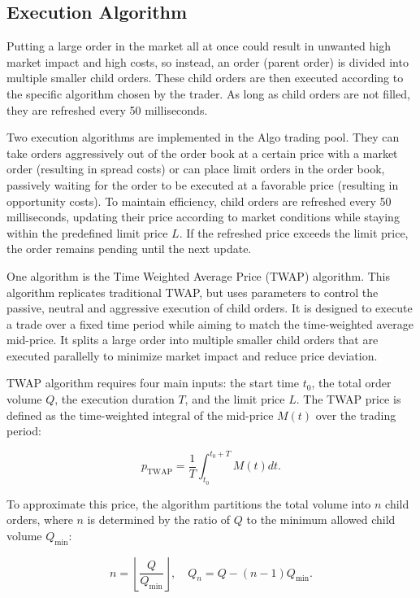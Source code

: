\subsection{Execution Algorithm}
Putting a large order in the market all at once could result in unwanted high market impact and high costs, so instead, an order (parent order) is divided into multiple smaller child orders. These child orders are then executed according to the specific algorithm chosen by the trader. As long as child orders are not filled, they are refreshed every 50 milliseconds. 

Two execution algorithms are implemented in the Algo trading pool. They can take orders aggressively out of the order book at a certain price with a market order (resulting in spread costs) or can place limit orders in the order book, passively waiting for the order to be executed at a favorable price (resulting in opportunity costs). To maintain efficiency, child orders are refreshed every 50 milliseconds, updating their price according to market conditions while staying within the predefined limit price $L$. If the refreshed price exceeds the limit price, the order remains pending until the next update.

One algorithm is the Time Weighted Average Price (TWAP) algorithm. This algorithm replicates traditional TWAP, but uses parameters to control the passive, neutral and aggressive execution of child orders. It is designed to execute a trade over a fixed time period while aiming to match the time-weighted average mid-price. It splits a large order into multiple smaller child orders that are executed parallelly to minimize market impact and reduce price deviation.

TWAP algorithm requires four main inputs: the start time $t_0$, the total order volume $Q$, the execution duration $T$, and the limit price $L$. The TWAP price is defined as the time-weighted integral of the mid-price $M(t)$ over the trading period:

\begin{equation}
    p_{\text{TWAP}} = \frac{1}{T} \int_{t_0}^{t_0+T} M(t) dt.
    \label{eq: TWQP price}
\end{equation}

To approximate this price, the algorithm partitions the total volume into $n$ child orders, where $n$ is determined by the ratio of $Q$ to the minimum allowed child volume $Q_{\min}$:

\begin{equation}
    n = \left\lfloor \frac{Q}{Q_{\min}} \right\rfloor, \quad Q_n = Q - (n-1) Q_{\min}.
    \label{eq: Q_n}
\end{equation}

